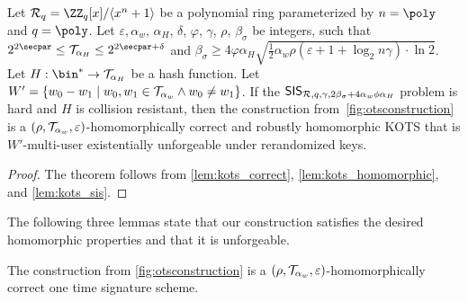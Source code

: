 \begin{theorem}\label{theo:kots}
Let $\ring_q=\ZZ_q[x]/\langle x^n+1\rangle$ be a polynomial ring parameterized by $n=\poly$ and $q=\poly$.
Let $\varepsilon, \alpha_w$, $\alpha_H$, $\delta$, $\varphi$, $\gamma$, $\rho$, $\beta_\sigma$ be integers, such that $2^{2\secpar}\leq \tern_{\alpha_H} \leq 2^{2\secpar+\delta}$ and $\beta_\sigma \geq 4\varphi\alpha_H\sqrt{\tfrac{1}{2}\alpha_w\rho(\varepsilon+1+\log_2n\gamma)\cdot\ln2}$.
Let $H : \bin^* \to \tern_{\alpha_H}$ be a hash function.
Let $W' = \{w_0-w_1\mid w_0,w_1\in\mathcal{T}_{\alpha_w} \land w_0\neq w_1\}$.
If the  $\mathsf{SIS}_{\mathcal{R},q,\gamma,2\beta_\sigma+4\alpha_w\phi\alpha_H}$ problem is hard and $H$ is collision resistant, then the construction from~\autoref{fig:otsconstruction} is a $(\rho,\mathcal{T}_{\alpha_w},\varepsilon)$-homomorphically correct and robustly homomorphic KOTS that is $W'$-multi-user existentially unforgeable under rerandomized keys.
\end{theorem}
\begin{proof}
The theorem follows from \autoref{lem:kots_correct}, \autoref{lem:kots_homomorphic}, and \autoref{lem:kots_sis}.
\end{proof}

The following three lemmas state that our construction satisfies the desired homomorphic properties and that it is unforgeable.

\begin{lemma}\label{lem:kots_correct}
  The construction from \autoref{fig:otsconstruction} is a $(\rho,\mathcal{T}_{\alpha_w},\varepsilon)$-homomorphically correct one time signature scheme.
\end{lemma}

